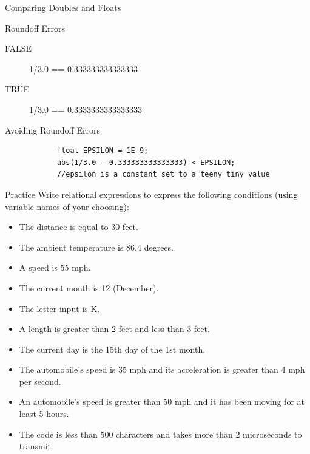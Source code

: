 \documentclass[xcolor={dvipsnames}]{beamer}
\begin{document}
\begin{frame}[fragile]{Comparing Doubles and Floats}
	\begin{block}{Roundoff Errors}
		\begin{description}
			\item[FALSE] 1/3.0 == 0.333333333333333
			\item[TRUE] 1/3.0 == 0.3333333333333333
		\end{description}
	\end{block}
	\pause
	\begin{block}{Avoiding Roundoff Errors}
		\begin{verbatim}
			float EPSILON = 1E-9;
			abs(1/3.0 - 0.333333333333333) < EPSILON;
			//epsilon is a constant set to a teeny tiny value
		\end{verbatim}
	\end{block}
\end{frame}

\begin{frame}{Practice}
Write relational expressions to express the following conditions (using variable names of your choosing):
	\begin{itemize}
		\item The distance is equal to 30 feet.	
		\item The ambient temperature is 86.4 degrees.
		\item A speed is 55 mph.
		\item The current month is 12 (December).
		\item The letter input is K.
		\item A length is greater than 2 feet and less than 3 feet.
		\item The current day is the 15th day of the 1st month.
		\item The automobile’s speed is 35 mph and its acceleration is greater than 4 mph per second.
		\item An automobile’s speed is greater than 50 mph and it has been moving for at least 5 hours.
		\item The code is less than 500 characters and takes more than 2 microseconds to transmit.
	\end{itemize}
\end{frame}
\end{document}
